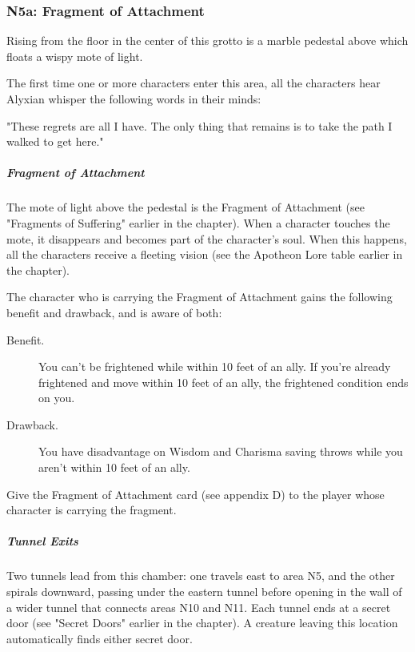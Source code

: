 \documentclass[10pt,a4paper,twoside,fancy,bg=print,twocolumn,openany,nodeprecatedcode]{dndbook}
\begin{document}
\subsubsection{N5a: Fragment of Attachment}
\begin{DndReadAloud}{}
Rising from the floor in the center of this grotto is a marble pedestal above which floats a wispy mote of light.

\end{DndReadAloud}

The first time one or more characters enter this area, all the characters hear Alyxian whisper the following words in their minds:

\begin{DndReadAloud}{}
"These regrets are all I have. The only thing that remains is to take the path I walked to get here."

\end{DndReadAloud}

\subparagraph{Fragment of Attachment}
The mote of light above the pedestal is the Fragment of Attachment (see "Fragments of Suffering" earlier in the chapter). When a character touches the mote, it disappears and becomes part of the character's soul. When this happens, all the characters receive a fleeting vision (see the Apotheon Lore table earlier in the chapter).

The character who is carrying the Fragment of Attachment gains the following benefit and drawback, and is aware of both:



\begin{description}
\item[Benefit.]
You can't be frightened while within 10 feet of an ally. If you're already frightened and move within 10 feet of an ally, the frightened condition ends on you.
\item[Drawback.]
You have disadvantage on Wisdom and Charisma saving throws while you aren't within 10 feet of an ally.
\end{description}



Give the Fragment of Attachment card (see appendix D) to the player whose character is carrying the fragment.

\subparagraph{Tunnel Exits}
Two tunnels lead from this chamber: one travels east to area N5, and the other spirals downward, passing under the eastern tunnel before opening in the wall of a wider tunnel that connects areas N10 and N11. Each tunnel ends at a secret door (see "Secret Doors" earlier in the chapter). A creature leaving this location automatically finds either secret door.
\end{document}
